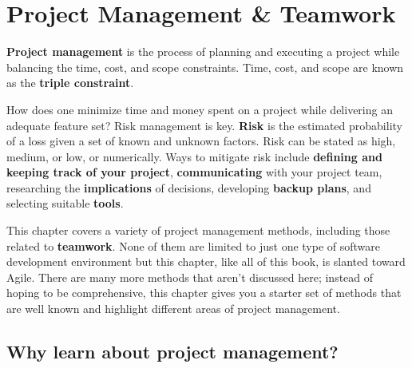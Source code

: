 \yesmargins
\chapter{Project Management \& Teamwork}


\marginpar{\projectManagementDef\margindivider}\marginpar{\tripleConstraintDef}\textbf{Project management} is the process of planning and executing a project while balancing the time, cost, and scope constraints. Time, cost, and scope are known as the \textbf{triple constraint}.

How does one minimize time and money spent on a project while delivering an adequate feature set? Risk management is key. \textbf{Risk} is the estimated probability of a loss given a set of known and unknown factors. Risk can be stated as high, medium, or low, or numerically. Ways to mitigate risk include \textbf{defining and keeping track of your project}, \textbf{communicating} with your project team, researching the \textbf{implications} of decisions, developing \textbf{backup plans}, and selecting suitable \textbf{tools}. 

This chapter covers a variety of project management methods, including those related to \textbf{teamwork}. None of them are limited to just one type of software development environment but this chapter, like all of this book, is slanted toward \marginpar{\riskDef\margindivider}\marginpar{\contingencyDef\margindivider}Agile\marginpar{\agileDef}. There are many more methods that aren't discussed here; instead of hoping to be comprehensive, this chapter gives you a starter set of methods that are well known and highlight different areas of project management.

\section{Why learn about project management?}

